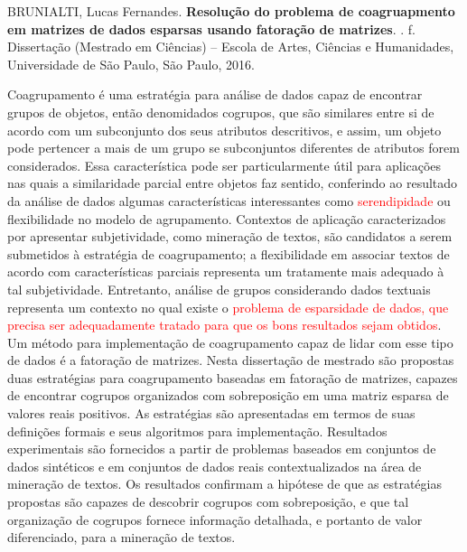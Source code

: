 \documentclass[
    12pt,                %
    oneside,            %
    a4paper,            %
    english,            %
    brazil                %
    ]{abntex2ppgsi}
\begin{document}
\setlength{\absparsep}{18pt} %
\begin{resumo}

%
%
%
%
\begin{flushleft}
BRUNIALTI, Lucas Fernandes. \textbf{Resolução do problema de coagruapmento em matrizes de dados esparsas usando fatoração de matrizes}. \imprimirdata. \pageref{LastPage} f. Dissertação (Mestrado em Ciências) – Escola de Artes, Ciências e Humanidades, Universidade de São Paulo, São Paulo, 2016.
\end{flushleft}

Coagrupamento é uma estratégia para análise de dados capaz de encontrar grupos de objetos, então denomidados cogrupos, que são similares entre si de acordo com um subconjunto dos seus atributos descritivos, e assim, um objeto pode pertencer a mais de um grupo se subconjuntos diferentes de atributos forem considerados. Essa característica pode ser particularmente útil para aplicações nas quais a similaridade parcial entre objetos faz sentido, conferindo ao resultado da análise de dados algumas características interessantes como \textcolor{red}{serendipidade} ou flexibilidade no modelo de agrupamento. Contextos de aplicação caracterizados por apresentar subjetividade, como mineração de textos, são candidatos a serem submetidos à estratégia de coagrupamento; a flexibilidade em associar textos de acordo com características parciais representa um tratamente mais adequado à tal subjetividade. Entretanto, análise de grupos considerando dados textuais representa um contexto no qual existe o \textcolor{red}{problema de esparsidade de dados, que precisa ser adequadamente tratado para que os bons resultados sejam obtidos}. Um método para implementação de coagrupamento capaz de lidar com esse tipo de dados é a fatoração de matrizes. Nesta dissertação de mestrado são propostas duas estratégias para coagrupamento baseadas em fatoração de matrizes, capazes de encontrar cogrupos organizados com sobreposição em uma matriz esparsa de valores reais positivos. As estratégias são apresentadas em termos de suas definições formais e seus algoritmos para implementação. Resultados experimentais são fornecidos a partir de problemas baseados em conjuntos de dados sintéticos e em conjuntos de dados reais contextualizados na área de mineração de textos. Os resultados confirmam a hipótese de que as estratégias propostas são capazes de descobrir cogrupos com sobreposição, e que tal organização de cogrupos fornece informação detalhada, e portanto de valor diferenciado, para a mineração de textos.


\end{resumo}
\end{document}
